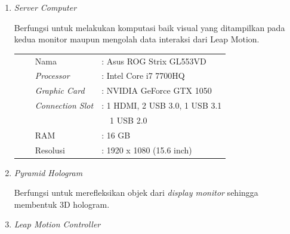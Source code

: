 \begin{enumerate}[nolistsep]
			\item \textit{Server Computer}
			
			Berfungsi untuk melakukan komputasi baik visual yang ditampilkan pada kedua monitor maupun mengolah data interaksi dari Leap Motion.
			\vspace{-2ex}
			\begin{table}[H]
				\begin{flushleft}
				\begin{tabular}{L{0.5cm} l L{2.55cm} l}
						&\textbullet & Nama 			& : Asus ROG Strix GL553VD \\
						&\textbullet & \textit{Processor}		& : Intel Core i7 7700HQ \\
						&\textbullet & \textit{Graphic Card}	& : NVIDIA GeForce GTX 1050 \\
						&\textbullet & \textit{Connection Slot}	& : 1 HDMI, 2 USB 3.0, 1 USB 3.1\\
						&  &  & \         \     1 USB 2.0 \\
						&\textbullet & RAM				& : 16 GB \\
						&\textbullet & Resolusi			& : 1920 x 1080 (15.6 inch)\\
					\end{tabular}
				\end{flushleft}
			\end{table}
			\vspace{-3.5ex}
		
			\item \textit{Pyramid Hologram}
			
			Berfungsi untuk merefleksikan objek dari \textit{display monitor} sehingga membentuk 3D hologram.

			
			\item \textit{Leap Motion Controller}
			

\end{enumerate}
